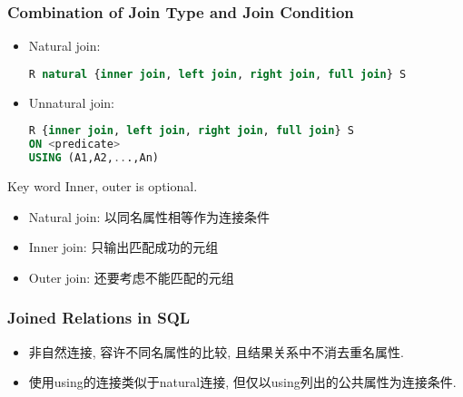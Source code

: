 \subsubsection{Combination of Join Type and Join Condition}
\begin{itemize}
    \item Natural join: 
    \begin{lstlisting}[language=sql]
R natural {inner join, left join, right join, full join} S
    \end{lstlisting}
    
    \item Unnatural join: 
    \begin{lstlisting}[language=sql]
R {inner join, left join, right join, full join} S
ON <predicate>
USING (A1,A2,...,An)
    \end{lstlisting}
\end{itemize}
Key word Inner, outer is optional. 
\begin{itemize}
    \item Natural join: 以同名属性相等作为连接条件
    \item Inner join: 只输出匹配成功的元组
    \item Outer join: 还要考虑不能匹配的元组
\end{itemize}

\subsubsection{Joined Relations in SQL}
\begin{itemize}
    \item 非自然连接, 容许不同名属性的比较, 且结果关系中不消去重名属性. 
    \item 使用using的连接类似于natural连接, 但仅以using列出的公共属性为连接条件. 
\end{itemize}
